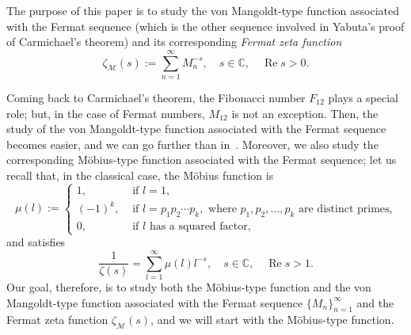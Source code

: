 \documentclass[11pt, a4paper]{article}
\newcommand{\C}{\mathbb{C}}
\renewcommand{\Re}{\operatorname{Re}}
\newcommand{\calM}{\mathcal{M}}
\theoremstyle{plain}
\theoremstyle{definition}
\begin{document}
The purpose of this paper is to study the von Mangoldt-type function associated with the Fermat sequence (which is the other sequence involved in Yabuta's proof of Carmichael's theorem) and its corresponding \textit{Fermat zeta function}
\begin{equation*}
  \zeta_{\calM}(s) := \sum_{n=1}^{\infty} M_n^{-s},
  \quad s\in \C,
  \quad \Re s>0.
\end{equation*}



Coming back to Carmichael's theorem, the Fibonacci number $F_{12}$ plays a special role;
but, in the case of Fermat numbers, $M_{12}$ is not an exception.
Then, the study of the von Mangoldt-type function associated with the Fermat sequence becomes easier, and we can go further than in~\cite{MoNaVa}. Moreover, we also study the corresponding M\"obius-type function associated with the Fermat sequence; let us recall that, in the classical case, the M\"obius function is
\[
  \mu(l) := 
  \begin{cases}
    1, & \text{ if } l = 1, 
    \\
    (-1)^k, & \text{ if } l = p_1 p_2 \cdots p_k, \text{ where } p_1, p_2, \dots, p_k \text{ are distinct primes,}
    \\
    0, & \text{ if } l \text{ has a squared factor,}
  \end{cases}
\]
and satisfies
\[
  \frac{1}{\zeta(s)} = \sum_{l=1}^{\infty} \mu(l)l^{-s},
  \quad s \in \C, \quad \Re s>1.
\]
Our goal, therefore, is to study both the M\"obius-type function and the von Mangoldt-type function associated with the Fermat sequence $\{M_n\}_{n=1}^\infty$ and the Fermat zeta function $\zeta_{\calM}(s)$, and we will start with the M\"obius-type function.
\end{document}
